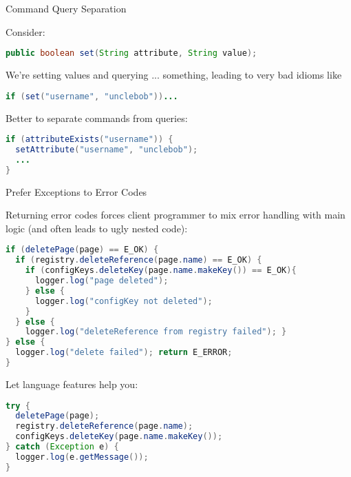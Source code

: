 \documentclass{beamer}
\begin{document}
\begin{frame}[fragile]{Command Query Separation}


Consider:
\begin{lstlisting}[language=Java]
public boolean set(String attribute, String value);
\end{lstlisting}
We're setting values and querying ... something, leading to very bad idioms like
\begin{lstlisting}[language=Java]
if (set("username", "unclebob"))...
\end{lstlisting}
Better to separate commands from queries:
\begin{lstlisting}[language=Java]
if (attributeExists("username")) {
  setAttribute("username", "unclebob");
  ...
}
\end{lstlisting}


\end{frame}

\begin{frame}[fragile]{Prefer Exceptions to Error Codes}

\vspace{-.06in}
Returning error codes forces client programmer to mix error handling with main logic (and often leads to ugly nested code):
\vspace{-.05in}
\begin{lstlisting}[language=Java]
if (deletePage(page) == E_OK) {
  if (registry.deleteReference(page.name) == E_OK) {
    if (configKeys.deleteKey(page.name.makeKey()) == E_OK){
      logger.log("page deleted");
    } else {
      logger.log("configKey not deleted");
    }
  } else {
    logger.log("deleteReference from registry failed"); }
} else {
  logger.log("delete failed"); return E_ERROR;
}
\end{lstlisting}
\vspace{-.06in}
Let language features help you:
\vspace{-.05in}
\begin{lstlisting}[language=Java]
try {
  deletePage(page);
  registry.deleteReference(page.name);
  configKeys.deleteKey(page.name.makeKey());
} catch (Exception e) {
  logger.log(e.getMessage());
}
\end{lstlisting}

\end{frame}
\end{document}
